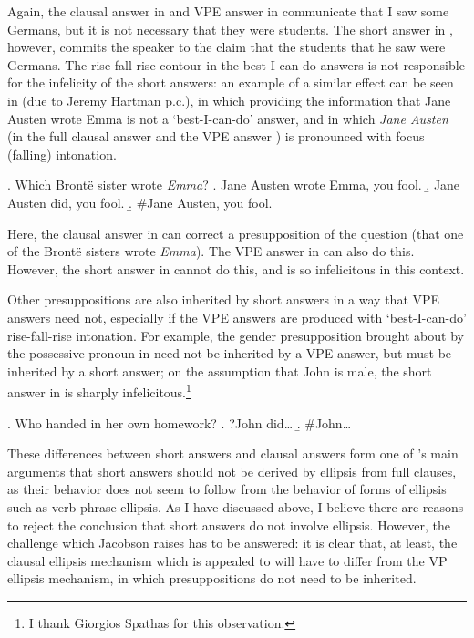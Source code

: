 \documentclass[doublespace]{umthesis}
\begin{document}
Again, the clausal answer in \Last[a] and VPE answer in \Last[b] communicate that I saw some Germans, but it is not necessary that they were students. The short answer in \Last[c], however, commits the speaker to the claim that the students that he saw were Germans.%
The rise-fall-rise contour in the best-I-can-do answers is not responsible for the infelicity of the short answers: an example of a similar effect can be seen in \Next (due to Jeremy Hartman p.c.), in which providing the information that Jane Austen wrote Emma is not a `best-I-can-do' answer, and in which {\it Jane Austen} (in the full clausal answer \Next[a] and the VPE answer \Next[b]) is pronounced with focus (falling) intonation.

\ex. 		Which Bront\"e sister wrote {\it Emma}?
		\a. Jane Austen wrote Emma, you fool.
		\b. Jane Austen did, you fool.
		\b. \#Jane Austen, you fool.
		
Here, the clausal answer in \Last[a] can correct a presupposition of the question (that one of the Bront\"e sisters wrote {\it Emma}). The VPE answer in \Last[b] can also do this. However, the short answer in \Last[c] cannot do this, and is so infelicitous in this context.

Other presuppositions are also inherited by short answers in a way that VPE answers need not, especially if the VPE answers are produced with `best-I-can-do' rise-fall-rise intonation. For example, the gender presupposition brought about by the possessive pronoun in \Next need not be inherited by a VPE answer, but must be inherited by a short answer; on the assumption that John is male, the short answer in \Next[b] is sharply infelicitous.\footnote{I thank Giorgios Spathas for this observation.}

\ex. 	Who handed in her own homework?
	\a. ?John did\ldots
	\b. \#John\ldots 

These differences between short answers and clausal answers form one of \cite{Ja13}'s main arguments that short answers should not be derived by ellipsis from full clauses, as their behavior does not seem to follow from the behavior of forms of ellipsis such as verb phrase ellipsis. As I have discussed above, I believe there are reasons to reject the conclusion that short answers do not involve ellipsis. However, the challenge which Jacobson raises has to be answered: it is clear that, at least, the clausal ellipsis mechanism which is appealed to will have to differ from the VP ellipsis mechanism, in which presuppositions do not need to be inherited.
\end{document}
